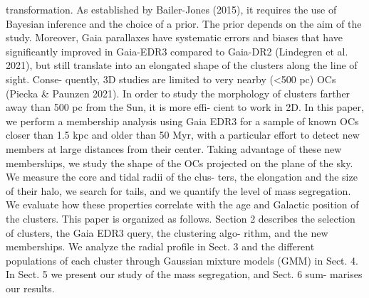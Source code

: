 \documentclass[../main.tex]{subfiles}
\begin{document}
transformation. As established by Bailer-Jones (2015), it requires the use of Bayesian inference and the choice of a prior. The prior depends on the aim of the study. Moreover, Gaia parallaxes have systematic errors and biases that have significantly improved in Gaia-EDR3 compared to Gaia-DR2 (Lindegren et al. 2021), but still translate into an elongated shape of the clusters along the line of sight. Conse- quently, 3D studies are limited to very nearby (<500 pc) OCs (Piecka & Paunzen 2021). In order to study the morphology of clusters farther away than 500 pc from the Sun, it is more effi- cient to work in 2D.
In this paper, we perform a membership analysis using Gaia EDR3 for a sample of known OCs closer than 1.5 kpc and older than 50 Myr, with a particular effort to detect new members at large distances from their center. Taking advantage of these new memberships, we study the shape of the OCs projected on the plane of the sky. We measure the core and tidal radii of the clus- ters, the elongation and the size of their halo, we search for tails, and we quantify the level of mass segregation. We evaluate how these properties correlate with the age and Galactic position of the clusters.
This paper is organized as follows. Section 2 describes the selection of clusters, the Gaia EDR3 query, the clustering algo- rithm, and the new memberships. We analyze the radial profile in Sect. 3 and the different populations of each cluster through Gaussian mixture models (GMM) in Sect. 4. In Sect. 5 we present our study of the mass segregation, and Sect. 6 sum- marises our results.
\end{document}
